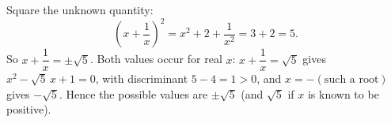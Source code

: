Square the unknown quantity:
\[
\left(x+\dfrac{1}{x}\right)^2=x^2+2+\dfrac{1}{x^2}=3+2=5 .
\]
So $x+\dfrac{1}{x}=\pm\sqrt5$. Both values occur for real $x$: $x+\dfrac{1}{x}=\sqrt5$ gives $x^2-\sqrt5\,x+1=0$, with discriminant $5-4=1>0$, and $x=-\left(\text{such a root}\right)$ gives $-\sqrt5$. Hence the possible values are $\boxed{\pm\sqrt5}$ (and $\sqrt5$ if $x$ is known to be positive).
